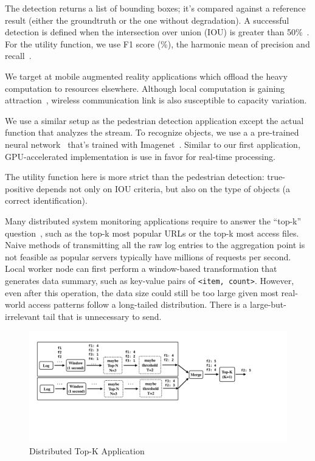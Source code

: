 The detection returns a list of bounding boxes; it's compared against a
reference result (either the groundtruth or the one without degradation). A
successful detection is defined when the intersection over union (IOU) is
greater than 50\%~\cite{everingham2010pascal}. For the utility function, we use
F1 score (\%), the harmonic mean of precision and
recall~\cite{Rijsbergen:1979:IR:539927}.

 We target at mobile augmented reality applications
which offload the heavy computation to resources elsewhere. Although local
computation is gaining attraction~\cite{satyanarayanan2009case, zhang2015cloud},
wireless communication link is also susceptible to capacity variation.

We use a similar setup as the pedestrian detection application except the actual
function that analyzes the stream. To recognize objects, we use a a pre-trained
neural network~\cite{darknet13} that's trained with
Imagenet~\cite{krizhevsky2012imagenet}. Similar to our first application,
GPU-accelerated implementation is use in favor for real-time processing.

The utility function here is more strict than the pedestrian detection:
true-positive depends not only on IOU criteria, but also on the type of objects
(a correct identification).

 Many distributed system monitoring applications
require to answer the ``top-k'' question~\cite{babcock2003distributed}, such as
the top-k most popular URLs or the top-k most access files. Naive methods of
transmitting all the raw log entries to the aggregation point is not feasible as
popular servers typically have millions of requests per second. Local worker
node can first perform a window-based transformation that generates data
summary, such as key-value pairs of \texttt{<item, count>}. However, even after
this operation, the data size could still be too large given most real-world
access patterns follow a long-tailed distribution. There is a
large-but-irrelevant tail that is unnecessary to send.

\begin{figure}
  \centering
  \includegraphics[width=\columnwidth]{figures/topk.pdf}
  \caption{Distributed Top-K Application}
  \label{fig:topk}
\end{figure}

